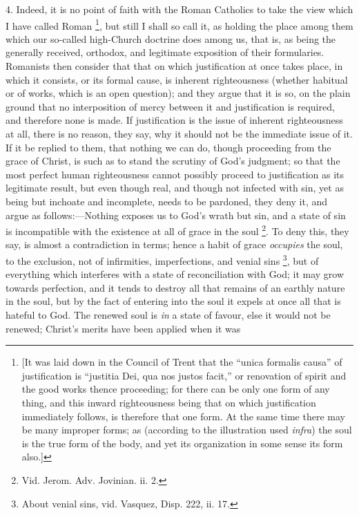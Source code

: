 4. Indeed, it is no point of faith with the Roman Catholics to take
the view which I have called Roman \footnote{[It was laid
down in the Council of Trent that the ``unica formalis causa'' of
justification is ``justitia Dei, qua nos justos facit,'' or
renovation of spirit and the good works thence proceeding; for there
can be only one form of any thing, and this inward righteousness being
that on which justification immediately follows, is therefore that one
form. At the same time there may be many improper forms; as (according
to the illustration used \emph{infra}) the soul is the true form of
the body, and yet its organization in some sense its form also.]}, but still I shall so call it, as holding the place among
them which our so-called high-Church doctrine does among us, that is,
as being the generally received, orthodox, and legitimate exposition
of their formularies. Romanists then consider that that on which
justification at once takes place, in which it consists, or its formal
cause, is inherent righteousness (whether habitual or of works, which
is an open question); and they argue that it is so, on the plain
ground that no interposition of mercy between it and justification is
required, and therefore none is made. If justification is the issue of
inherent righteousness at all, there is no reason, they say, why it
should not be the immediate issue of it. If it be replied to them,
that nothing we can do, though proceeding from the grace of Christ, is
such as to stand the scrutiny of God's judgment; so that the most
perfect human righteousness cannot possibly proceed to justification
as its legitimate result, but even though real, and though not
infected with sin, yet as being but inchoate and incomplete, needs to
be pardoned, they deny it, and argue as follows:—Nothing exposes us
to God's wrath but sin, and a state of sin is incompatible with the
existence at all of grace in the soul \footnote{Vid. Jerom.
Adv. Jovinian. ii. 2.}. To deny this, they say, is almost a contradiction in terms;
hence a habit of grace \emph{occupies} the soul, to the exclusion, not
of infirmities, imperfections, and venial sins \footnote{About venial
sins, vid. Vasquez, Disp. 222, ii. 17.}, but of everything which interferes with a state of
reconciliation with God; it may grow towards perfection, and it tends
to destroy all that remains of an earthly nature in the soul,
but by the fact of entering into the soul it expels at once all that
is hateful to God. The renewed soul is \emph{in} a state of favour, else it
would not be renewed; Christ's merits have been applied when it was
